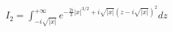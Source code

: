 \documentclass[preview]{standalone}
\begin{document}
\begin{align*}
I_2=\displaystyle \int_{-i\sqrt{|x|}}^{+\infty}e^{-\frac{2i}{3}|x|^{3/2}+i\sqrt{|x|}(z-i\sqrt{|x|})^2}dz
\end{align*}
\end{document}
